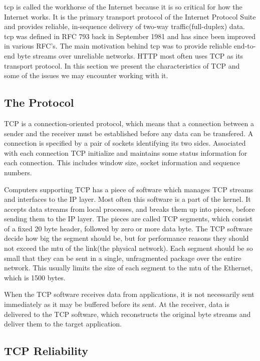 \gls{tcp} is called the workhorse of the Internet because it is so critical for
how the Internet works. It is the primary transport protocol of the Internet
Protocol Suite\cite{rfc-1122} and provides reliable, in-sequence delivery of
two-way traffic(full-duplex) data.  \gls{tcp} was defined in RFC
793\cite{rfc-793} back in September 1981 and has since been improved in various
RFC's. The main motivation behind \gls{tcp} was to provide reliable end-to-end
byte streams over unreliable networks.  HTTP most often uses TCP as its
transport protocol. In this section we present the characteristics of TCP and
some of the issues we may encounter working with it.

 \subsection{The Protocol}

 TCP is a connection-oriented protocol, which means that a connection between a
 sender and the receiver must be established before any data can be transfered.
 A connection is specified by a pair of sockets identifying its two sides.
 Associated with each connection TCP initialize and maintains some status
 information for each connection. This includes window size, socket information
 and sequence numbers.

Computers supporting TCP has a piece of software which manages TCP streams and
interfaces to the IP layer. Most often this software is a part of the
kernel\cite{computer-networks}. It accepts data streams from local processes,
and breaks them up into pieces, before sending them to the IP layer. The pieces
are called TCP segments, which consist of a fixed 20 byte header, followed by
zero or more data byte. The TCP software decide how big the segment should be,
but for performance reasons they should not exceed the \gls{mtu} of the link(the
physical network). Each segment should be so small that they can be sent in a
single, unfragmented package over the entire network. This usually limits the
size of each segment to the \gls{mtu} of the Ethernet, which is 1500 bytes.

When the TCP software receives data from applications, it is not necessarily
sent immediately as it may be buffered before its sent. At the receiver, data is
delivered to the TCP software, which reconstructs the original byte streams and
deliver them to the target application.


\subsection{TCP Reliability}

